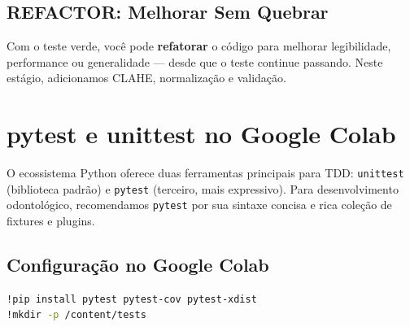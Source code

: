 
\subsection{REFACTOR: Melhorar Sem Quebrar}

Com o teste verde, você pode \textbf{refatorar} o código para melhorar
legibilidade, performance ou generalidade — desde que o teste continue
passando. Neste estágio, adicionamos CLAHE, normalização e validação.



\section{pytest e unittest no Google Colab}

O ecossistema Python oferece duas ferramentas principais para TDD:
\texttt{unittest} (biblioteca padrão) e \texttt{pytest} (terceiro, mais
expressivo). Para desenvolvimento odontológico, recomendamos \texttt{pytest}
por sua sintaxe concisa e rica coleção de fixtures e plugins.

\subsection{Configuração no Google Colab}

\begin{lstlisting}[language=bash, caption=Instalação e configuração do pytest no Colab]
!pip install pytest pytest-cov pytest-xdist
!mkdir -p /content/tests
\end{lstlisting}

